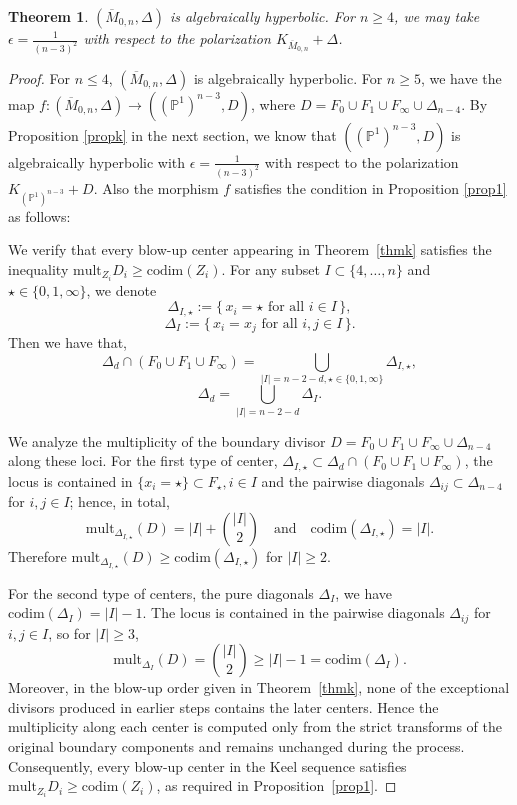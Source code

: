 \documentclass{amsart}
\newtheorem{theorem}{Theorem}[section]
\theoremstyle{definition}
\theoremstyle{remark}
\newcommand{\PP}{\mathbb{P}}
\begin{document}
\begin{theorem}
$(\overline{M}_{0,n}, \Delta)$ is algebraically hyperbolic. For $n\geq 4$, we may take $\epsilon = \frac 1{(n-3)^2}$ with respect to the polarization $K_{\overline{M}_{0,n}}+\Delta$.
\end{theorem}

\begin{proof}
For $n\leq 4$, $(\overline{M}_{0,n},\Delta)$ is algebraically hyperbolic. For $n\geq5$, we have the map  $f:(\overline{M}_{0,n},\Delta)\to((\mathbb P^1)^{n-3}, D)$, where $D =F_0\cup F_1\cup F_\infty\cup\Delta_{n-4}$. By Proposition \ref{propk} in the next section, we know that $((\mathbb P^1)^{n-3}, D)$ is algebraically hyperbolic with $\epsilon  = \frac 1{(n-3)^2}$ with respect to the polarization $K_{(\PP^1)^{n-3}}+D$. Also the morphism $f$ satisfies the condition in Proposition \ref{prop1} as follows: 


We verify that every blow-up center appearing in Theorem~\ref{thmk}
satisfies the inequality 
\(\mathrm{mult}_{Z_i}D_i \ge \mathrm{codim}(Z_i)\).
For any subset \(I\subset\{4,\ldots,n\}\) and 
\(\star\in\{0,1,\infty\}\),
we denote
\[
\Delta_{I,\star} := \{\,x_i=\star \text{ for all } i\in I\,\},
\] 
\[\Delta_I := \{\,x_i=x_j\text{ for all }i,j\in I\,\}.\]
Then we have that, \[\Delta_d \cap (F_0\cup F_1\cup F_\infty ) = \bigcup_{|I|=n-2-d, \star \in \{0,1,\infty\}} \Delta_{I,\star},\] \[\Delta_d = \bigcup_{|I|=n-2-d} \Delta_I.\]

We analyze the multiplicity of the boundary divisor 
\(D = F_0\cup F_1\cup F_\infty\cup \Delta_{n-4}\) along these loci.
For the first type of center,
\(\Delta_{I,\star}\subset \Delta_d \cap(F_0\cup F_1\cup F_\infty)\), 
the locus is contained in $\{x_i = \star\}\subset F_\star, i\in I$ and the pairwise diagonals 
\(\Delta_{ij}\subset \Delta_{n-4}\) for \(i,j\in I\); hence, in total, 
\[
\mathrm{mult}_{\Delta_{I,\star}}(D)
= |I| + \binom{|I|}{2}
\quad\text{and}\quad
\mathrm{codim}(\Delta_{I,\star})=|I|.
\]
Therefore 
\(\mathrm{mult}_{\Delta_{I,\star}}(D)\ge \mathrm{codim}(\Delta_{I,\star})\) for \(|I|\ge2\).

For the second type of centers, the pure diagonals \(\Delta_I\),
we have 
\(\mathrm{codim}(\Delta_I)=|I|-1\). The locus is contained in the pairwise diagonals
\(\Delta_{ij}\) for \(i,j\in I\),
so for $|I|\geq 3$,
\[
\mathrm{mult}_{\Delta_I}(D)=\binom{|I|}{2}\ge |I|-1=\mathrm{codim}(\Delta_I).
\]
Moreover, in the blow-up order given in Theorem~\ref{thmk},
none of the exceptional divisors produced in earlier steps
contains the later centers. 
Hence the multiplicity along each center is computed only from the 
strict transforms of the original boundary components and 
remains unchanged during the process.
Consequently, every blow-up center in the Keel sequence satisfies 
\(\mathrm{mult}_{Z_i} D_i \ge \mathrm{codim}(Z_i)\),
as required in Proposition~\ref{prop1}.
\end{proof}
\end{document}
